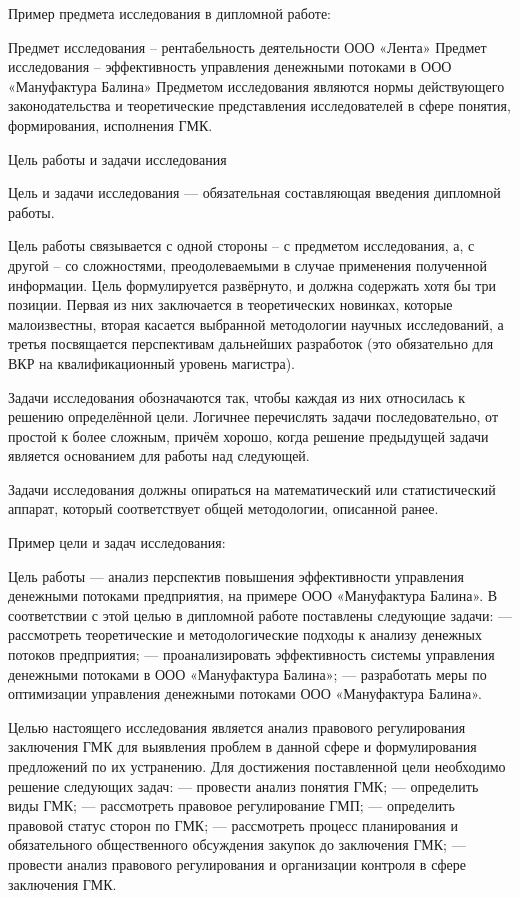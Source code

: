     Пример предмета исследования в дипломной работе:

        Предмет исследования – рентабельность деятельности ООО «Лента»
        Предмет исследования – эффективность управления денежными потоками в ООО «Мануфактура Балина»
        Предметом исследования являются нормы действующего законодательства и теоретические представления исследователей в сфере понятия, формирования, исполнения ГМК.

Цель работы и задачи исследования

Цель и задачи исследования — обязательная составляющая введения дипломной работы.

Цель работы связывается с одной стороны – с предметом исследования, а, с другой – со сложностями, преодолеваемыми в случае применения полученной информации. Цель формулируется развёрнуто, и должна содержать хотя бы три позиции. Первая из них заключается в теоретических новинках, которые малоизвестны, вторая касается выбранной методологии научных исследований, а третья посвящается перспективам дальнейших разработок  (это  обязательно для ВКР на квалификационный уровень магистра).

Задачи исследования обозначаются так, чтобы каждая из них относилась к решению определённой цели. Логичнее перечислять задачи последовательно, от простой к более сложным, причём хорошо, когда решение предыдущей задачи является основанием для работы над следующей.

Задачи исследования должны опираться на математический или статистический аппарат, который соответствует общей методологии, описанной ранее.

    Пример цели и задач исследования:

    Цель работы — анализ перспектив повышения эффективности управления денежными потоками предприятия, на примере ООО «Мануфактура Балина».
    В соответствии с этой целью в дипломной работе поставлены следующие задачи:
    —   рассмотреть теоретические и методологические подходы к анализу денежных потоков предприятия;
    —   проанализировать эффективность системы управления денежными потоками в ООО «Мануфактура Балина»;
    —   разработать меры по оптимизации управления денежными потоками ООО «Мануфактура Балина».

    Целью настоящего исследования является анализ правового регулирования заключения ГМК для выявления проблем в данной сфере и формулирования предложений по их устранению.
    Для достижения поставленной цели необходимо решение следующих задач:
    — провести анализ понятия ГМК;
    — определить виды ГМК;
    — рассмотреть правовое регулирование ГМП;
    — определить правовой статус сторон по ГМК;
    — рассмотреть процесс планирования и обязательного общественного обсуждения закупок до заключения ГМК;
    — провести анализ правового регулирования и организации контроля в сфере заключения ГМК.

